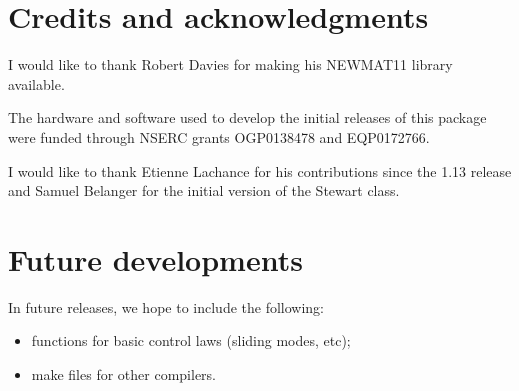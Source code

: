 \documentclass[dvips,11pt,fleqn]{report}
\begin{document}
\chapter{Credits and acknowledgments}

I would like to thank Robert Davies for making his \textsf{NEWMAT11}
library available.

The hardware and software used to develop the initial releases of this
package were funded through NSERC grants OGP0138478 and EQP0172766.

I would like to thank Etienne Lachance for his contributions since the
1.13 release and Samuel Belanger for the initial version of the
Stewart class.

\chapter{Future developments}

In future releases, we hope to include the following:
\begin{itemize}
\item functions for basic control laws (sliding modes, etc);
\item make files for other compilers.
\end{itemize}





\appendix




\end{document}
